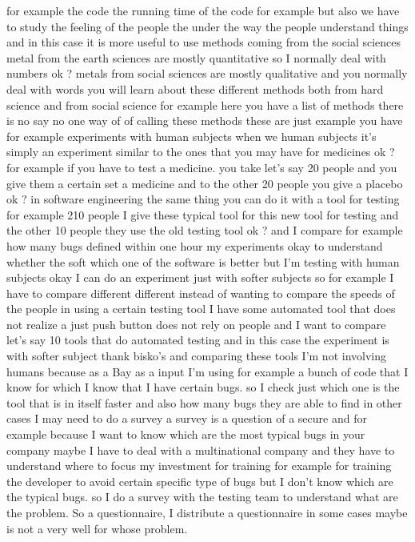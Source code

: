 \documentclass[conference, compsoc, twoside]{IEEEtran}
\begin{document}
for example the code the running time of the code 
for example but also we have to study the feeling of the people the under the way the people understand things and in this case it is more useful to use methods coming from the social sciences metal from the earth sciences are mostly quantitative 
so I normally deal with numbers ok ? metals from social sciences are mostly qualitative and you normally deal with words you will learn about these different methods both from hard science and from social science 
for example here you have a list of methods there is no say no one way of of calling these methods these are just example you have 
for example experiments with human subjects when we human subjects it's simply an experiment similar to the ones that you may have for medicines ok ? 
for example if you have to test a medicine.
you take let's say 20 people and you give them a certain set a medicine and to the other 20 people you give a placebo ok ? in software engineering the same thing you can do it with a tool for testing 
for example 210 people I give these typical tool for this new tool for testing and the other 10 people they use the old testing tool ok ? and I compare 
for example how many bugs defined within one hour my experiments okay to understand whether the soft which one of the software is better but I'm testing with human subjects okay I can do an experiment just with softer subjects so 
for example I have to compare different different instead of wanting to compare the speeds of the people in using a certain testing tool I have some automated tool that does not realize a just push button does not rely on people and I want to compare let's say 10 tools that do automated testing and in this case the experiment is with softer subject thank bisko's and comparing these tools I'm not involving humans because as a Bay as a input I'm using 
for example a bunch of code that I know for which I know that I have certain bugs. 
so I check just which one is the tool that is in itself faster and also how many bugs they are able to find in other cases I may need to do a survey a survey is a question of a secure and 
for example because I want to know which are the most typical bugs in your company maybe I have to deal with a multinational company and they have to understand where to focus my investment for training 
for example for training the developer to avoid certain specific type of bugs but I don't know which are the typical bugs.
so I do a survey with the testing team to understand what are the problem. 
So a questionnaire, I distribute a questionnaire in some cases maybe is not a very well for whose problem. 
\end{document}
